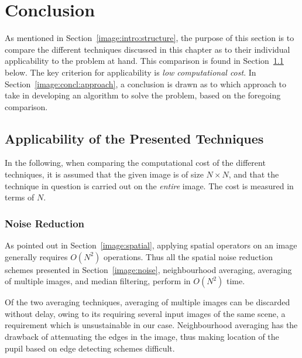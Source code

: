 
\section{Conclusion}
\label{image:concl}

As mentioned in Section~\ref{image:intro:structure}, the purpose of
this section is to compare the different techniques discussed in this
chapter as to their individual applicability to the problem at hand.
This comparison is found in Section~\ref{image:concl:comp} below.  The
key criterion for applicability is {\em low computational cost\/}.  In
Section~\ref{image:concl:approach}, a conclusion is drawn as to which
approach to take in developing an algorithm to solve the problem,
based on the foregoing comparison.

\subsection{Applicability of the Presented Techniques}
\label{image:concl:comp}

In the following, when comparing the computational cost of the
different techniques, it is assumed that the given image is of size
$N\times N$, and that the technique in question is carried out on the
{\em entire\/} image.  The cost is measured in terms of $N$.

\subsubsection{Noise Reduction}

As pointed out in Section~\ref{image:spatial}, applying spatial
operators on an image generally requires $O(N^{2})$ operations.  Thus
all the spatial noise reduction schemes presented in
Section~\ref{image:noise}, neighbourhood averaging, averaging of
multiple images, and median filtering, perform in $O(N^{2})$ time.

Of the two averaging techniques, averaging of multiple images can be
discarded without delay, owing to its requiring several input images
of the same scene, a requirement which is unsustainable in our case.
Neighbourhood averaging has the drawback of attenuating the edges in
the image, thus making location of the pupil based on edge detecting
schemes difficult.

